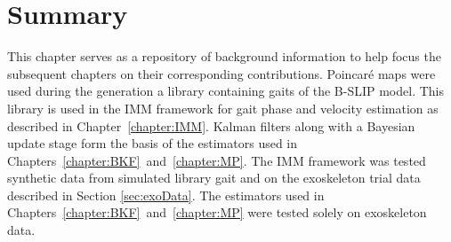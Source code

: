 \section{Summary}
This chapter serves as a repository of background information to help focus the subsequent chapters on their corresponding contributions. Poincar\'e maps were used during the generation a library containing gaits of the B-SLIP model. This library is used in the IMM framework for gait phase and velocity estimation as described in Chapter~\ref{chapter:IMM}. Kalman filters along with a Bayesian update stage form the basis of the estimators used in Chapters~\ref{chapter:BKF}~and~\ref{chapter:MP}. The IMM framework was tested synthetic data from simulated library gait and on the exoskeleton trial data described in Section \ref{sec:exoData}. The estimators used in Chapters~\ref{chapter:BKF}~and~\ref{chapter:MP} were tested solely on exoskeleton data.
